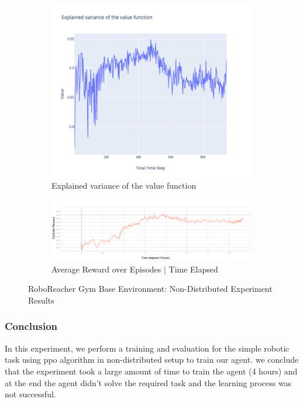 \begin{figure}[!htb]
		\begin{subfigure}[!htb]{0.35\textwidth}
				\centering
				\includegraphics[width=\textwidth]{figures/exps/1st_exp/vf_explained_var}
				\caption{Explained variance of the value function}
				\label{fig:vf_explained_var}
		\end{subfigure}
		\hfill
		\begin{subfigure}[!htb]{0.35\textwidth}
				\centering
				\includegraphics[width=\textwidth]{figures/exps/1st_exp/avg_reward_time}
				\caption{Average Reward over Episodes | Time Elapsed}
				\label{fig:avg_reward_time}
		\end{subfigure}
		\hfill

		 \caption{RoboReacher Gym Base Environment: Non-Distributed Experiment Results}
		 \label{fig:1st_exp_results}
\end{figure}

\subsubsection{Conclusion}

In this experiment, we perform a training and evaluation for the simple robotic task using ppo algorithm in non-distributed setup to train our agent. we conclude that the experiment took a large amount of time to train the agent (4 hours) and at the end the agent didn't solve the required task and the learning process was not successful. 